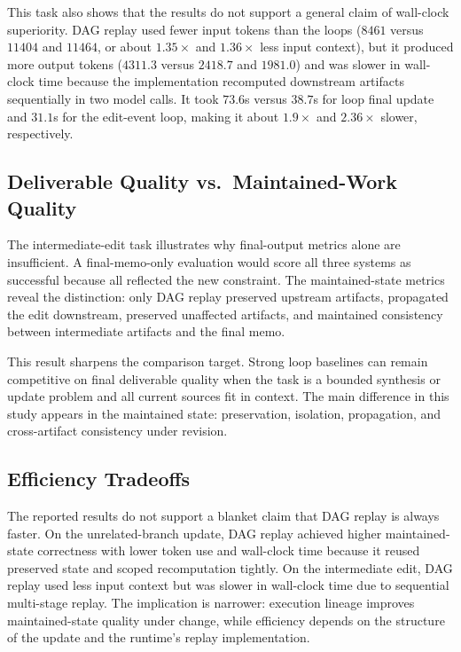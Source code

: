 \documentclass{article}
\begin{document}
This task also shows that the results do not support a general claim of wall-clock superiority. DAG replay used fewer input tokens than the loops ($8461$ versus $11404$ and $11464$, or about $1.35\times$ and $1.36\times$ less input context), but it produced more output tokens ($4311.3$ versus $2418.7$ and $1981.0$) and was slower in wall-clock time because the implementation recomputed downstream artifacts sequentially in two model calls. It took $73.6$s versus $38.7$s for loop final update and $31.1$s for the edit-event loop, making it about $1.9\times$ and $2.36\times$ slower, respectively.

\subsection{Deliverable Quality vs.\ Maintained-Work Quality}

The intermediate-edit task illustrates why final-output metrics alone are insufficient. A final-memo-only evaluation would score all three systems as successful because all reflected the new constraint. The maintained-state metrics reveal the distinction: only DAG replay preserved upstream artifacts, propagated the edit downstream, preserved unaffected artifacts, and maintained consistency between intermediate artifacts and the final memo.

This result sharpens the comparison target. Strong loop baselines can remain competitive on final deliverable quality when the task is a bounded synthesis or update problem and all current sources fit in context. The main difference in this study appears in the maintained state: preservation, isolation, propagation, and cross-artifact consistency under revision.

\subsection{Efficiency Tradeoffs}

The reported results do not support a blanket claim that DAG replay is always faster. On the unrelated-branch update, DAG replay achieved higher maintained-state correctness with lower token use and wall-clock time because it reused preserved state and scoped recomputation tightly. On the intermediate edit, DAG replay used less input context but was slower in wall-clock time due to sequential multi-stage replay. The implication is narrower: execution lineage improves maintained-state quality under change, while efficiency depends on the structure of the update and the runtime's replay implementation.
\end{document}

